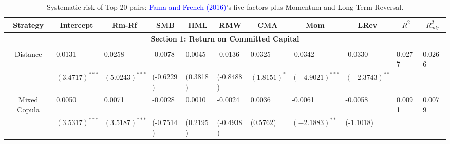 \documentclass[a4paper,12pt]{report}
\begin{document}
\begin{sidewaystable}
	\centering \scriptsize
	\caption{Systematic risk of Top 20 pairs: \textcolor{blue}{Fama and French} \textcolor{blue}{(2016)}'s five factors plus Momentum and Long-Term Reversal.}
	\begin{threeparttable}[H]
		\begin{tabularx}{\textwidth}{@{\extracolsep{\fill}} lllllllllll@{}}
			\toprule
			\multicolumn{1}{c}{Strategy} & \multicolumn{1}{c}{Intercept} &  \multicolumn{1}{c}{Rm-Rf} &  \multicolumn{1}{c}{SMB} &  \multicolumn{1}{c}{HML} &  \multicolumn{1}{c}{RMW} &  \multicolumn{1}{c}{CMA} & 
			\multicolumn{1}{c}{Mom} &  \multicolumn{1}{c}{LRev} &  \multicolumn{1}{c}{$R^{2}$} & \multicolumn{1}{c}{$R^{2}_{adj}$} \\
			\midrule
			\multicolumn{11}{c}{\textbf{Section 1: Return on Committed Capital}} \\
			\multicolumn{1}{c}{} & \multicolumn{1}{c}{} & \multicolumn{1}{c}{} & \multicolumn{1}{c}{} & \multicolumn{1}{c}{} & \multicolumn{1}{c}{} & \multicolumn{1}{c}{} & \multicolumn{1}{c}{} & \multicolumn{1}{c}{} & \multicolumn{1}{c}{} & \\
			\multicolumn{1}{c}{Distance} & 0.0131 & 0.0258 & -0.0078 & 0.0045 & -0.0136 & 0.0325 & -0.0342 & -0.0330 & 0.0277 & 0.0266 \\
			\multicolumn{1}{c}{} & $(3.4717)^{***}$ & $(5.0243)^{***}$ & (-0.6229) & (0.3818) & (-0.8488) & $(1.8151)^{*}$ & $(-4.9021)^{***}$ & $(-2.3743)^{**}$ & & \\
			\multicolumn{1}{c}{Mixed Copula} & 0.0050 & 0.0071 & -0.0028 & 0.0010 & -0.0024 & 0.0036 & -0.0061 & -0.0058 & 0.0091 & 0.0079 \\
			\multicolumn{1}{c}{} & $(3.5317)^{***}$ & $(3.5187)^{***}$ & (-0.7514) & (0.2195) & (-0.4938) & (0.5762) & $(-2.1883)^{**}$ & (-1.1018) & & \\
			

\end{tabularx}
\end{threeparttable}
\end{sidewaystable}
\end{document}
